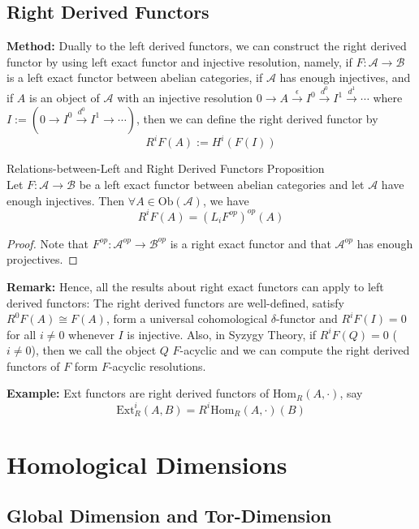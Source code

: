 \subsection{Right Derived Functors}

\noindent\textbf{Method:} Dually to the left derived functors, we can construct the right derived functor by using left exact functor and injective resolution, namely, if $F:\mathcal{A} \to \mathcal{B}$ is a left exact functor between abelian categories, if $\mathcal{A}$ has enough injectives, and if $A$ is an object of $\mathcal{A}$ with an injective resolution $0\to A\xrightarrow{\epsilon} I^0 \xrightarrow{d^0} I^1 \xrightarrow{d^1} \cdots$ where $I:= (0\to I^0 \xrightarrow{d^0} I^1 \to \cdots)$, then we can define the right derived functor by
\[
R^iF(A):= H^i(F(I))
\]

\begin{proposition}{Relations-between-Left and Right Derived Functors Proposition}\\
Let $F:\mathcal{A} \to \mathcal{B}$ be a left exact functor between abelian categories and let $\mathcal{A}$ have enough injectives. Then $\forall A\in \text{Ob} (\mathcal{A})$, we have
\[
R^iF(A) = (L_iF^{op})^{op} (A)
\]
\end{proposition}

\begin{proof}
    Note that $F^{op}:\mathcal{A} ^{op} \to \mathcal{B} ^{op}$ is a right exact functor and that $\mathcal{A}^{op}$ has enough projectives.
\end{proof}

\noindent\textbf{Remark:} Hence, all the results about right exact functors can apply to left derived functors: The right derived functors are well-defined, satisfy $R^0F(A) \cong F(A)$, form a universal cohomological $\delta$-functor and $R^iF(I)=0$ for all $i\neq 0$ whenever $I$ is injective. Also, in Syzygy Theory, if $R^iF(Q)=0$ ($i\neq 0$), then we call the object $Q$ $F$-acyclic and we can compute the right derived functors of $F$ form $F$-acyclic resolutions.

\noindent\textbf{Example:} Ext functors are right derived functors of $\text{Hom}_R(A,\cdot)$, say
\[
\text{Ext}_R^i (A,B)= R^i\text{Hom}_R(A,\cdot) (B)
\]

\section{Homological Dimensions}

\subsection{Global Dimension and Tor-Dimension}

